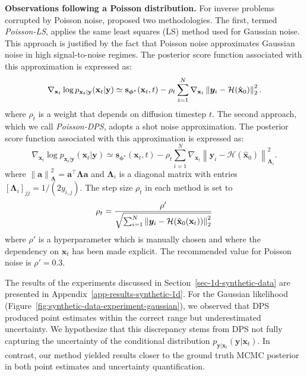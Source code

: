 \textbf{Observations following a Poisson distribution.} For inverse problems corrupted by Poisson noise, \citet{chung2023} proposed two methodologies. The first, termed \textit{Poisson-LS}, applies the same least squares (LS) method used for Gaussian noise. This approach is justified by the fact that Poisson noise approximates Gaussian noise in high signal-to-noise regimes. The posterior score function associated with this approximation is expressed as:
\begin{equation*}
\nabla_{\mathbf{x}_t}\log p_{\mathbf{x}_t \vert  \mathbf{y}}(\mathbf{x}_t \vert  \mathbf{y}) \simeq \mathbf{s}_{\boldsymbol{\phi}^{\star}}(\mathbf{x}_t, t) - \rho_t \sum_{i = 1}^N  \nabla_{\mathbf{x}_t} \left\lVert  \boldsymbol{y}_i - \mathcal{H}(\hat{\mathbf{x}}_{0})  \right\rVert_2^2.
\end{equation*}
where $\rho_t$ is a weight that depends on diffusion timestep $t$.
The second approach, which we call \textit{Poisson-DPS}, adopts a shot noise approximation. The posterior score function associated with this approximation is expressed as:
\begin{equation} \label{eq:poisson_dps}
\nabla_{\mathbf{x}_t}\log p_{\mathbf{x}_t \vert  \mathbf{y}}(\mathbf{x}_t \vert  \mathbf{y}) \simeq \mathbf{s}_{\boldsymbol{\phi}^{\star}}(\mathbf{x}_t, t) - \rho_t \sum_{i = 1}^N  \nabla_{\mathbf{x}_t} 
\left\lVert \boldsymbol{y}_i - \mathcal{H}(\hat{\mathbf{x}}_{0}) \right\rVert_{\boldsymbol{\Lambda}_i}^2.
\end{equation}
where $\left\lVert \mathbf{a} \right\rVert_{\boldsymbol{\Lambda}}^2 = \mathbf{a}^\top \boldsymbol{\Lambda} \mathbf{a}$ and $\boldsymbol{\Lambda}_i$ is a diagonal matrix with entries $[\boldsymbol{\Lambda}_i]_{jj} = 1/(2 y_{i,j})$.
The step size $\rho_t$ in each method is set to 
\begin{equation*}
    \rho_t = \frac{\rho'}{\sqrt{\sum_{i = 1}^N \left\lVert \boldsymbol{y}_i - \mathcal{H}(\hat{\mathbf{x}}_{0}(\mathbf{x}_t)) \right\rVert_2^2}}
\end{equation*}
where $\rho'$ is a hyperparameter which is manually chosen and where the dependency on $\mathbf{x}_{t}$ has been made explicit. The recommended value for Poisson noise is $\rho' = 0.3$. 

The results of the experiments discussed in Section~\ref{sec-1d-synthetic-data} are presented in Appendix~\ref{app-results-synthetic-1d}. 
For the Gaussian likelihood (Figure~\ref{fig:synthetic-data-experiment-gaussian}), we observed that DPS produced point estimates within the correct range but underestimated uncertainty. We hypothesize that this discrepancy stems from DPS not fully capturing the uncertainty of the conditional distribution $p_{\mathbf{y} \vert \mathbf{x}_t}(\mathbf{y} \vert \mathbf{x}_t)$. In contrast, our method yielded results closer to the ground truth MCMC posterior in both point estimates and uncertainty quantification.  


